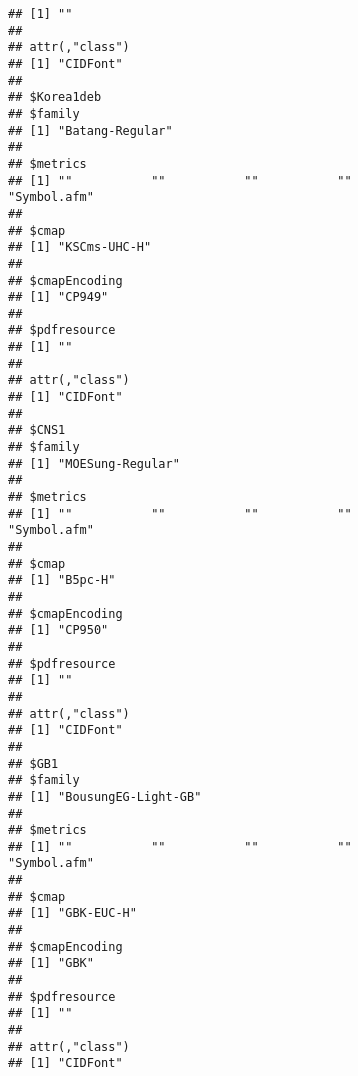 \documentclass[
]{article}
\begin{document}
\begin{verbatim}
## [1] ""
## 
## attr(,"class")
## [1] "CIDFont"
## 
## $Korea1deb
## $family
## [1] "Batang-Regular"
## 
## $metrics
## [1] ""           ""           ""           ""           "Symbol.afm"
## 
## $cmap
## [1] "KSCms-UHC-H"
## 
## $cmapEncoding
## [1] "CP949"
## 
## $pdfresource
## [1] ""
## 
## attr(,"class")
## [1] "CIDFont"
## 
## $CNS1
## $family
## [1] "MOESung-Regular"
## 
## $metrics
## [1] ""           ""           ""           ""           "Symbol.afm"
## 
## $cmap
## [1] "B5pc-H"
## 
## $cmapEncoding
## [1] "CP950"
## 
## $pdfresource
## [1] ""
## 
## attr(,"class")
## [1] "CIDFont"
## 
## $GB1
## $family
## [1] "BousungEG-Light-GB"
## 
## $metrics
## [1] ""           ""           ""           ""           "Symbol.afm"
## 
## $cmap
## [1] "GBK-EUC-H"
## 
## $cmapEncoding
## [1] "GBK"
## 
## $pdfresource
## [1] ""
## 
## attr(,"class")
## [1] "CIDFont"
\end{verbatim}
\end{document}
